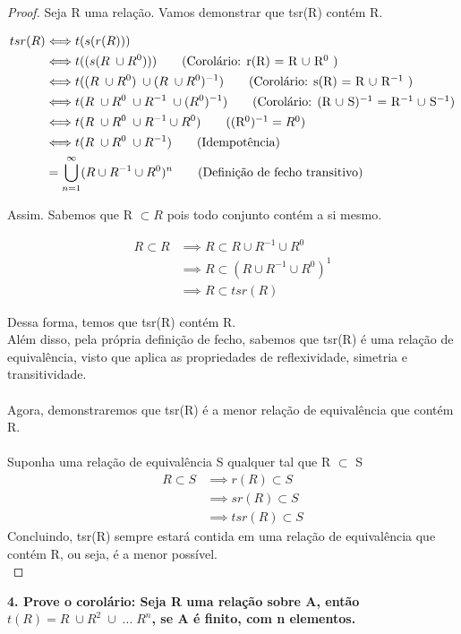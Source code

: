 \documentclass[12pt]{article}
\begin{document}
\begin{proof}
    Seja R uma relação. Vamos demonstrar que tsr(R) contém R.

    \begin{align}
        tsr(R) 
        &\Longleftrightarrow t(s(r(R))) \\
        &\Longleftrightarrow t((s(R \; \cup R^0))) \tag{Corolário: r(R) = R $\cup$ R$^0$ } \\
        &\Longleftrightarrow t((R \; \cup R^0) \; \cup (R \;\cup R^0)^{-1}) \tag{Corolário: s(R) = R $\cup$ R$^{-1}$ } \\
        &\Longleftrightarrow t(R \; \cup R^0 \; \cup R^{-1} \; \cup (R^0)^{-1}) \tag{Corolário: (R $\cup$ S)$^{-1}$ = R$^{-1} \; \cup$ S$^{-1}$} \\
        &\Longleftrightarrow t(R \; \cup R^0 \; \cup R^{-1} \cup R^0) \tag{(R$^0)^{-1} = R^0$} \\
        &\Longleftrightarrow t(R \; \cup R^0 \; \cup R^{-1})   \tag{Idempotência} \\
        &= \bigcup_{n=1}^{\infty} (R \cup R^{-1} \cup R^0)^{n} \tag{Definição de fecho transitivo}
    \end{align}

Assim. Sabemos que R $\subset R$ pois todo conjunto contém a si mesmo.

    \begin{align}
        R \subset R
        &\implies R \subset R \cup R^{-1} \cup R^0  \tag{Idempotência} \\
        &\implies R \subset (R \cup R^{-1} \cup R^0)^1 \\
        &\implies R \subset tsr(R)
    \end{align}

Dessa forma, temos que tsr(R) contém R. \\
Além disso, pela própria definição de fecho, sabemos que tsr(R) é uma relação de equivalência, visto que aplica as propriedades de reflexividade, simetria e transitividade. 
\\
\\
Agora, demonstraremos que tsr(R) é a menor relação de equivalência que contém R.\\
\\
Suponha uma relação de equivalência S qualquer tal que R $\subset$ S
\begin{align}
    R \subset S
    & \implies r(R) \subset S \tag{S já é reflexiva } \\
    & \implies sr(R) \subset S \tag{S já é simétrica} \\
    & \implies tsr(R) \subset S \tag{S já é transitiva}
\end{align}
Concluindo, tsr(R) sempre estará contida em uma relação de equivalência que contém R, ou seja, é a menor possível. 
\\

\end{proof}
\textbf{4. Prove o corolário: Seja R uma relação sobre A, então $t(R) = R \; \cup R^2 \; \cup \; ... \; R^n  $, se A é finito, com n elementos.}
\end{document}
